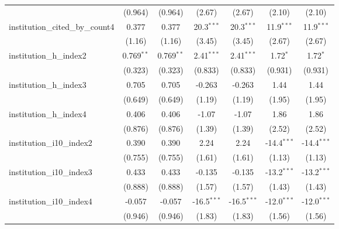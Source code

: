 \begin{tabular}{lcccccc}
                                         & (0.964)       & (0.964)       & (2.67)        & (2.67)        & (2.10)        & (2.10)\\   
   institution\_cited\_by\_count4        & 0.377         & 0.377         & 20.3$^{***}$  & 20.3$^{***}$  & 11.9$^{***}$  & 11.9$^{***}$\\   
                                         & (1.16)        & (1.16)        & (3.45)        & (3.45)        & (2.67)        & (2.67)\\   
   institution\_h\_index2                & 0.769$^{**}$  & 0.769$^{**}$  & 2.41$^{***}$  & 2.41$^{***}$  & 1.72$^{*}$    & 1.72$^{*}$\\   
                                         & (0.323)       & (0.323)       & (0.833)       & (0.833)       & (0.931)       & (0.931)\\   
   institution\_h\_index3                & 0.705         & 0.705         & -0.263        & -0.263        & 1.44          & 1.44\\   
                                         & (0.649)       & (0.649)       & (1.19)        & (1.19)        & (1.95)        & (1.95)\\   
   institution\_h\_index4                & 0.406         & 0.406         & -1.07         & -1.07         & 1.86          & 1.86\\   
                                         & (0.876)       & (0.876)       & (1.39)        & (1.39)        & (2.52)        & (2.52)\\   
   institution\_i10\_index2              & 0.390         & 0.390         & 2.24          & 2.24          & -14.4$^{***}$ & -14.4$^{***}$\\   
                                         & (0.755)       & (0.755)       & (1.61)        & (1.61)        & (1.13)        & (1.13)\\   
   institution\_i10\_index3              & 0.433         & 0.433         & -0.135        & -0.135        & -13.2$^{***}$ & -13.2$^{***}$\\   
                                         & (0.888)       & (0.888)       & (1.57)        & (1.57)        & (1.43)        & (1.43)\\   
   institution\_i10\_index4              & -0.057        & -0.057        & -16.5$^{***}$ & -16.5$^{***}$ & -12.0$^{***}$ & -12.0$^{***}$\\   
                                         & (0.946)       & (0.946)       & (1.83)        & (1.83)        & (1.56)        & (1.56)\\   

\end{tabular}
